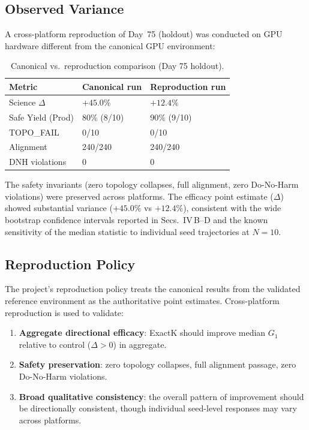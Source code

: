 \subsection{Observed Variance}

A cross-platform reproduction of Day~75 (holdout) was conducted on GPU hardware different from the canonical GPU environment:

\begin{table}[htbp]
\caption{Canonical vs.\ reproduction comparison (Day 75 holdout).}
\label{tab:repro}
\begin{ruledtabular}
\begin{tabular}{lll}
Metric & Canonical run & Reproduction run \\
\hline
Science $\Delta$ & $+45.0\%$ & $+12.4\%$ \\
Safe Yield (Prod) & 80\% (8/10) & 90\% (9/10) \\
TOPO\_FAIL & 0/10 & 0/10 \\
Alignment & 240/240 & 240/240 \\
DNH violations & 0 & 0 \\
\end{tabular}
\end{ruledtabular}
\end{table}

The safety invariants (zero topology collapses, full alignment, zero Do-No-Harm violations) were preserved across platforms. The efficacy point estimate ($\Delta$) showed substantial variance ($+45.0\%$ vs $+12.4\%$), consistent with the wide bootstrap confidence intervals reported in Secs.~IV\,B--D and the known sensitivity of the median statistic to individual seed trajectories at $N{=}10$.

\subsection{Reproduction Policy}

The project's reproduction policy treats the canonical results from the validated reference environment as the authoritative point estimates. Cross-platform reproduction is used to validate:

\begin{enumerate}
\item \textbf{Aggregate directional efficacy}: ExactK should improve median $G_1$ relative to control ($\Delta > 0$) in aggregate.
\item \textbf{Safety preservation}: zero topology collapses, full alignment passage, zero Do-No-Harm violations.
\item \textbf{Broad qualitative consistency}: the overall pattern of improvement should be directionally consistent, though individual seed-level responses may vary across platforms.
\end{enumerate}

